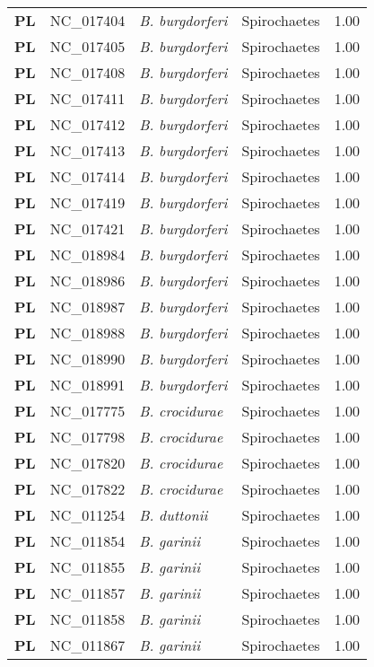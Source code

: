\begin{adjustwidth}{-3cm}{2cm}
{\begin{supertabular}{>{\bfseries}l|p{0.1\textwidth}p{0.14\textwidth}l|l}
PL & NC\_017404 & \textit{B. burgdorferi} &  Spirochaetes & 1.00\\
PL & NC\_017405 & \textit{B. burgdorferi} &  Spirochaetes & 1.00\\
PL & NC\_017408 & \textit{B. burgdorferi} &  Spirochaetes & 1.00\\
PL & NC\_017411 & \textit{B. burgdorferi} &  Spirochaetes & 1.00\\
PL & NC\_017412 & \textit{B. burgdorferi} &  Spirochaetes & 1.00\\
PL & NC\_017413 & \textit{B. burgdorferi} &  Spirochaetes & 1.00\\
PL & NC\_017414 & \textit{B. burgdorferi} &  Spirochaetes & 1.00\\
PL & NC\_017419 & \textit{B. burgdorferi} &  Spirochaetes & 1.00\\
PL & NC\_017421 & \textit{B. burgdorferi} &  Spirochaetes & 1.00\\
PL & NC\_018984 & \textit{B. burgdorferi} &  Spirochaetes & 1.00\\
PL & NC\_018986 & \textit{B. burgdorferi} &  Spirochaetes & 1.00\\
PL & NC\_018987 & \textit{B. burgdorferi} &  Spirochaetes & 1.00\\
PL & NC\_018988 & \textit{B. burgdorferi} &  Spirochaetes & 1.00\\
PL & NC\_018990 & \textit{B. burgdorferi} &  Spirochaetes & 1.00\\
PL & NC\_018991 & \textit{B. burgdorferi} &  Spirochaetes & 1.00\\
PL & NC\_017775 & \textit{B. crocidurae} &  Spirochaetes & 1.00\\
PL & NC\_017798 & \textit{B. crocidurae} &  Spirochaetes & 1.00\\
PL & NC\_017820 & \textit{B. crocidurae} &  Spirochaetes & 1.00\\
PL & NC\_017822 & \textit{B. crocidurae} &  Spirochaetes & 1.00\\
PL & NC\_011254 & \textit{B. duttonii} &  Spirochaetes & 1.00\\
PL & NC\_011854 & \textit{B. garinii} &  Spirochaetes & 1.00\\
PL & NC\_011855 & \textit{B. garinii} &  Spirochaetes & 1.00\\
PL & NC\_011857 & \textit{B. garinii} &  Spirochaetes & 1.00\\
PL & NC\_011858 & \textit{B. garinii} &  Spirochaetes & 1.00\\
PL & NC\_011867 & \textit{B. garinii} &  Spirochaetes & 1.00\\

\end{supertabular}}
\end{adjustwidth}
